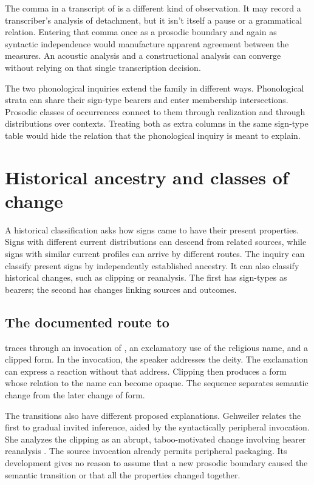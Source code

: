 \documentclass[12pt]{article}
\begin{document}
The comma in a transcript of 
is a different kind of observation. It may record a transcriber's
analysis of detachment, but it isn't itself a pause or a grammatical
relation. Entering that comma once as a prosodic boundary and again
as syntactic independence would manufacture apparent agreement between
the measures. An acoustic analysis and a constructional analysis can
converge without relying on that single transcription decision.

The two phonological inquiries extend the family in different ways. Phonological strata can share their sign-type bearers and
enter membership intersections. Prosodic classes of occurrences connect
to them through realization and through distributions over contexts.
Treating both as extra columns in the same sign-type table would hide
the relation that the phonological inquiry is meant to explain.

\section{Historical ancestry and classes of change}\label{sec:history}

A historical classification asks how signs came to have their present
properties. Signs with different current distributions can descend from
related sources, while signs with similar current profiles can arrive by
different routes. The inquiry can classify present signs by independently
established ancestry. It can also classify historical changes, such as
clipping or reanalysis. The first has sign-types as bearers; the second
has changes linking sources and outcomes.

\subsection{The documented route to }

\textcite{gehweiler2008} traces  through an invocation of ,
an exclamatory use of the religious name, and a clipped form. In the invocation, the speaker addresses the deity.
The exclamation can express a reaction without that address. Clipping
then produces a form whose relation to the name can become opaque.
The sequence separates semantic change from the later change of form.

The transitions also have different proposed explanations. Gehweiler
relates the first to gradual invited inference, aided by the syntactically
peripheral invocation. She analyzes the clipping as an abrupt, taboo-motivated
change involving hearer reanalysis \citep[84--88]{gehweiler2008}. The
source invocation already permits peripheral packaging. Its development
gives no reason to assume that a new prosodic boundary caused
the semantic transition or that all the properties changed together.
\end{document}
